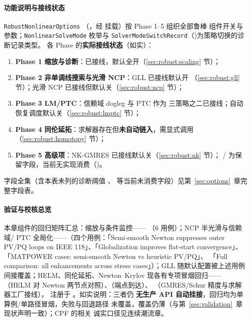\paragraph{功能说明与接线状态} \texttt{RobustNonlinearOptions}
（，经
 挂载）按 Phase 1--5 组织全部鲁棒
组件开关与参数；\texttt{NonlinearSolveMode} 枚举与
\texttt{SolverModeSwitchRecord}（)为策略切换的诊断记录类型。
各 Phase 的\textbf{实际接线状态}（如实）：
\begin{enumerate}
  \item \textbf{Phase 1 缩放与诊断}：已接线，默认全开（\ref{sec:robust:scaling} 节）；
  \item \textbf{Phase 2 非单调线搜索与光滑 NCP}：GLL 已接线默认开
        （\ref{sec:robust:gll} 节）；光滑 NCP 已接线但默认关（\ref{sec:robust:ncp} 节）；
  \item \textbf{Phase 3 LM/PTC}：信赖域 dogleg 与 PTC 作为 
        三策略之二已接线；自动恢复调度默认关（\ref{sec:robust:lmptc} 节）；
  \item \textbf{Phase 4 同伦延拓}：求解器存在但\textbf{未自动链入}，需显式调用
        （\ref{sec:robust:homotopy} 节）；
  \item \textbf{Phase 5 高级项}：NK-GMRES 已接线默认关（\ref{sec:robust:nk} 节）；
        /
        为保留字段，当前无实现消费（)。
\end{enumerate}
字段全集（含本表未列的诊断阈值 、
 等当前未消费字段）见第~\ref{sec:options}~章完整字段表。
\paragraph{验证与校核总览} 本章组件的回归矩阵汇总：缩放与条件监控——
（6 用例）；NCP 半光滑与信赖域/
PTC 全局化——（四个用例：「Semi-smooth Newton
suppresses outer PV/PQ loops on IEEE 118」、「Globalization improves flat-start
convergence」、「MATPOWER cases: semi-smooth Newton vs heuristic PV/PQ」、
「Full comparison: all enhancements across stress cases」）；GLL 随默认配置被上述用例间接覆盖；HELM、同伦延拓、Newton--Krylov
现各有专项冒烟回归——（HELM 对 Newton
两节点对照）、（端点到达）、
（GMRES/Schur 精度与求解器工厂接线），
注册于 。如实说明：三者仍
\textbf{无生产 API 自动挂接}，回归均为单算例/单路径冒烟，失败与回退路径
未覆盖，覆盖仍薄（与第~\ref{sec:validation}~章现状声明一致）；CPF 的相关
诚实口径见连续潮流章。
